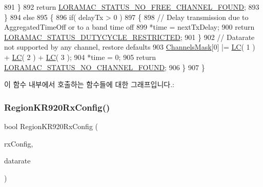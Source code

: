 \begin{DoxyCode}
891         \}
892         \textcolor{keywordflow}{return} \mbox{\hyperlink{group___l_o_r_a_m_a_c_gga1d18f26b344040b3ec5c3db662919661a61b018814bb071d16d3f970f907fafb2}{LORAMAC\_STATUS\_NO\_FREE\_CHANNEL\_FOUND}};
893     \}
894     \textcolor{keywordflow}{else}
895     \{
896         \textcolor{keywordflow}{if}( delayTx > 0 )
897         \{
898             \textcolor{comment}{// Delay transmission due to AggregatedTimeOff or to a band time off}
899             *time = nextTxDelay;
900             \textcolor{keywordflow}{return} \mbox{\hyperlink{group___l_o_r_a_m_a_c_gga1d18f26b344040b3ec5c3db662919661a0c982ada0769ecee2e1041fb6945ddd4}{LORAMAC\_STATUS\_DUTYCYCLE\_RESTRICTED}};
901         \}
902         \textcolor{comment}{// Datarate not supported by any channel, restore defaults}
903         \mbox{\hyperlink{_region_k_r920_8c_a2188957b5ca6af8092154d7ccbfa5757}{ChannelsMask}}[0] |= \mbox{\hyperlink{group___r_e_g_i_o_n_ga12fa17e5c1016e01a9d82c25027deb1b}{LC}}( 1 ) + \mbox{\hyperlink{group___r_e_g_i_o_n_ga12fa17e5c1016e01a9d82c25027deb1b}{LC}}( 2 ) + \mbox{\hyperlink{group___r_e_g_i_o_n_ga12fa17e5c1016e01a9d82c25027deb1b}{LC}}( 3 );
904         *time = 0;
905         \textcolor{keywordflow}{return} \mbox{\hyperlink{group___l_o_r_a_m_a_c_gga1d18f26b344040b3ec5c3db662919661a393266a9952cf6617917f1fce181efcd}{LORAMAC\_STATUS\_NO\_CHANNEL\_FOUND}};
906     \}
907 \}
\end{DoxyCode}
이 함수 내부에서 호출하는 함수들에 대한 그래프입니다.\+:
\mbox{\label{group___r_e_g_i_o_n_k_r920_gaef3bb50f109ca60815986e3559a32acc}} 
\subsubsection{\texorpdfstring{Region\+K\+R920\+Rx\+Config()}{RegionKR920RxConfig()}}
{\footnotesize\ttfamily bool Region\+K\+R920\+Rx\+Config (\begin{DoxyParamCaption}\item[{\mbox{\hyperlink{group___r_e_g_i_o_n_ga375c038078dfcfc7ef14280021db719e}{Rx\+Config\+Params\+\_\+t}} $\ast$}]{rx\+Config,  }\item[{int8\+\_\+t $\ast$}]{datarate }\end{DoxyParamCaption})}



